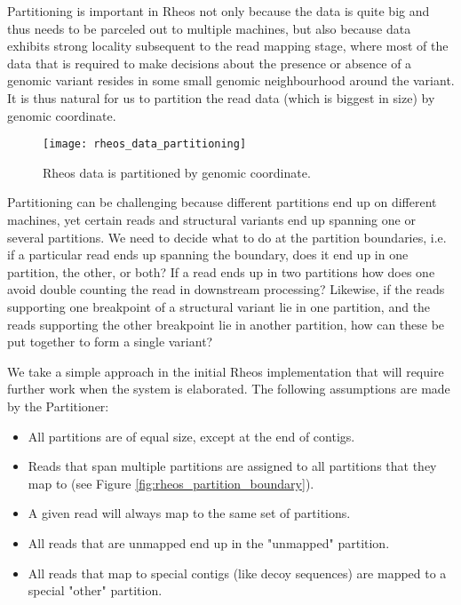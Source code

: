 Partitioning is important in Rheos not only because the data is quite big and thus needs to be parceled out to multiple machines, but also because data exhibits strong locality subsequent to the read mapping stage, where most of the data that is required to make decisions about the presence or absence of a genomic variant resides in some small genomic neighbourhood around the variant. It is thus natural for us to partition the read data (which is biggest in size) by genomic coordinate.

\begin{figure}[H]
    \texttt{[image: rheos\_data\_partitioning]}
    \centering
    \caption {Rheos data is partitioned by genomic coordinate.}
    \label{fig:rheos_data_partitioning}
\end{figure}

Partitioning can be challenging because different partitions end up on different machines, yet certain reads and structural variants end up spanning one or several partitions. We need to decide what to do at the partition boundaries, i.e. if a particular read ends up spanning the boundary, does it end up in one partition, the other, or both? If a read ends up in two partitions how does one avoid double counting the read in downstream processing? Likewise, if the reads supporting one breakpoint of a structural variant lie in one partition, and the reads supporting the other breakpoint lie in another partition, how can these be put together to form a single variant?

We take a simple approach in the initial Rheos implementation that will require further work when the system is elaborated. The following assumptions are made by the Partitioner:

\begin{itemize}
    \item All partitions are of equal size, except at the end of contigs.
    \item Reads that span multiple partitions are assigned to all partitions that they map to (see Figure \ref{fig:rheos_partition_boundary}).
    \item A given read will always map to the same set of partitions.
    \item All reads that are unmapped end up in the "unmapped" partition.
    \item All reads that map to special contigs (like decoy sequences) are mapped to a special "other" partition.
\end{itemize}

